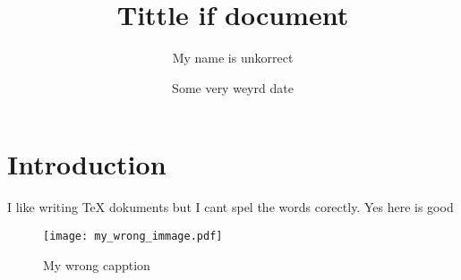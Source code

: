 \documentclass{article}
\title{Tittle if document}
\author{My name is unkorrect}
\date{Some very weyrd date}
\begin{document}
\maketitle

\section{Introduction}

I like writing TeX dokuments but I cant spel the words corectly. Yes here is good


\begin{figure}
    \centering
    \texttt{[image: my\_wrong\_immage.pdf]} %
    \caption{My wrong capption} %
    \label{fig:my_wrong_labell} %
\end{figure}
\end{document}
